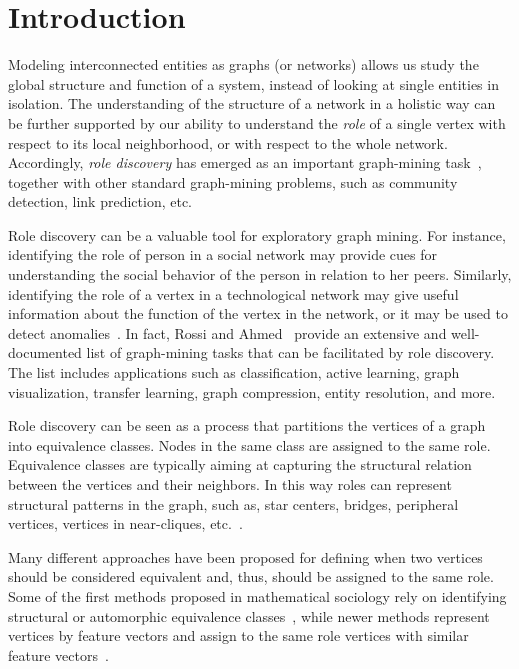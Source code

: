 \section{Introduction}


Modeling interconnected entities as graphs (or networks)
allows us study the global structure and function of a system,
instead of looking at single entities in isolation.
The understanding of the structure of a network in a holistic way
can be further supported by our ability to 
understand the \emph{role} of a single vertex 
with respect to its local neighborhood, 
or with respect to the whole network.
Accordingly, 
\emph{role discovery} 
has emerged as an important
graph-mining task~\cite{gilpin2013guided,danilevsky2013entity,henderson2012rolx,rossi2015role,ruan2014simultaneous,yang2015network,zhao2013inferring}, 
together with other standard graph-mining problems, 
such as community detection, link prediction,  etc.

Role discovery can be a valuable tool for exploratory graph mining. 
For instance, identifying the role of person in a social network 
may provide cues for understanding the social behavior of the person
in relation to her peers. 
Similarly, identifying the role of a vertex in a technological network 
may give useful information about the function of the vertex in the network, 
or it may be used to detect anomalies~\cite{rossi2013multi}.
In fact, Rossi and Ahmed~\cite{rossi2015role}
provide an extensive and well-documented list of graph-mining tasks
that can be facilitated by role discovery. 
The list includes applications such as 
classification, active learning, graph visualization, 
transfer learning, graph compression, entity resolution, and more.

Role discovery can be seen as a process that
partitions the vertices of a graph into equivalence classes.
Nodes in the same class are assigned to the same role. 
Equivalence classes are typically
aiming at capturing the structural relation between the vertices and their neighbors. 
In this way roles can represent 
structural patterns in the graph, 
such as, star centers, bridges, peripheral vertices, vertices in near-cliques, etc.~\cite{henderson2012rolx}.

Many different approaches have been proposed
for defining when two vertices should be considered equivalent and, thus,  
should be assigned to the same role. 
Some of the first methods proposed in mathematical sociology
rely on identifying structural or automorphic equivalence 
classes~\cite{everett1994regular,lorrain1971structural}, 
while newer methods 
represent vertices by feature vectors 
and assign to the same role vertices with similar 
feature vectors~\cite{henderson2012rolx,rossi2015role,rossi2013modeling,zhao2013inferring}.

